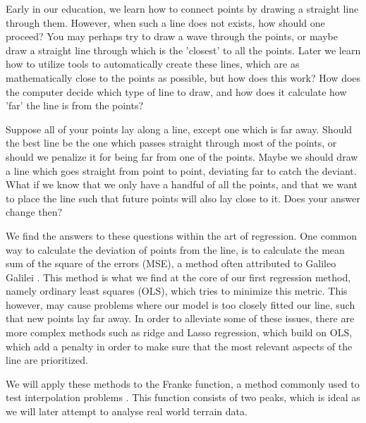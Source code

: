 \documentclass{article}
\begin{document}
Early in our education, we learn how to connect points by drawing a straight line through them. However, when such a line does not exists, how should one proceed? You may perhaps try to draw a wave through the points, or maybe draw a straight line through which is the 'closest' to all the points. Later we learn how to utilize tools to automatically create these lines, which are as mathematically close to the points as possible, but how does this work? How does the computer decide which type of line to draw, and how does it calculate how 'far' the line is from the points?

Suppose all of your points lay along a line, except one which is far away. Should the best line be the one which passes straight through most of the points, or should we penalize it for being far from one of the points. Maybe we should draw a line which goes straight from point to point, deviating far to catch the deviant. What if we know that we only have a handful of all the points, and that we want to place the line such that future points will also lay close to it. Does your answer change then?

We find the answers to these questions within the art of regression. One common way to calculate the deviation of points from the line, is to calculate the mean sum of the square of the errors (MSE), a method often attributed to Galileo Galilei \cite{galileo}. This method is what we find at the core of our first regression method, namely ordinary least squares (OLS), which tries to minimize this metric. This however, may cause problems where our model is too closely fitted our line, such that new points lay far away. In order to alleviate some of these issues, there are more complex methods such as ridge and Lasso regression, which build on OLS, which add a penalty in order to make sure that the most relevant aspects of the line are prioritized.

We will apply these methods to the Franke function, a method commonly used to test interpolation problems \cite{Franke:1982}. This function consists of two peaks, which is ideal as we will later attempt to analyse real world terrain data.
\end{document}

